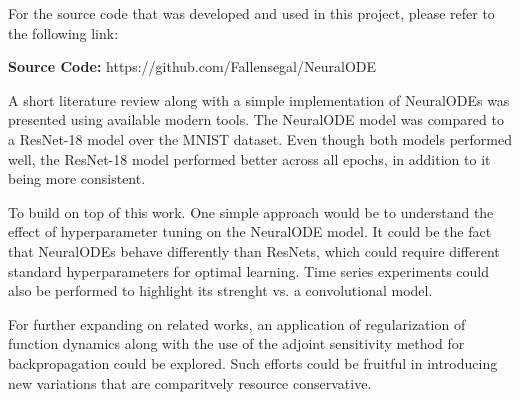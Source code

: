 \documentclass{article}
\begin{document}
For the source code that was developed and used in this project, please refer to the following link:

\textbf{Source Code:} https://github.com/Fallensegal/NeuralODE

A short literature review along with a simple implementation of NeuralODEs was presented using available modern tools. 
The NeuralODE model was compared to a ResNet-18 model over the MNIST dataset. Even though both models performed well, 
the ResNet-18 model performed better across all epochs, in addition to it being more consistent.

To build on top of this work. One simple approach would be to understand the effect of hyperparameter tuning on the NeuralODE model.
It could be the fact that NeuralODEs behave differently than ResNets, which could require different standard hyperparameters for optimal
learning. Time series experiments could also be performed to highlight its strenght vs. a convolutional model.

For further expanding on related works, an application of regularization of function dynamics along with the use of the adjoint sensitivity method
for backpropagation could be explored. Such efforts could be fruitful in introducing new variations that are comparitvely resource conservative.






\end{document}
